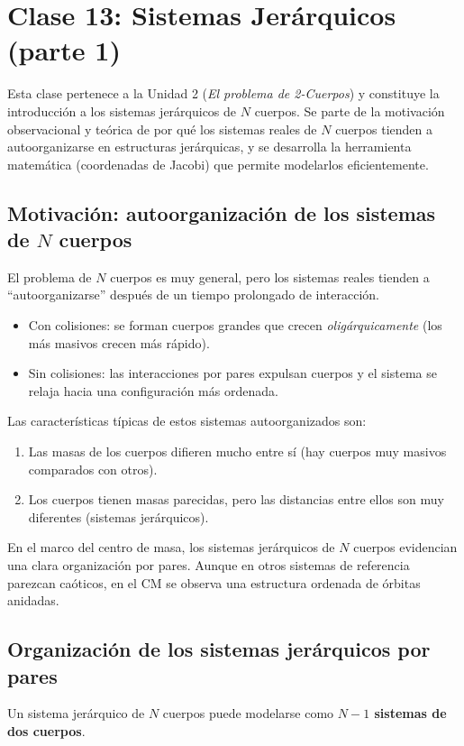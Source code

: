 \chapter{Clase 13: Sistemas Jerárquicos (parte 1)}

Esta clase pertenece a la Unidad 2 (\emph{El problema de 2-Cuerpos}) y constituye la introducción a los sistemas jerárquicos de \(N\) cuerpos. Se parte de la motivación observacional y teórica de por qué los sistemas reales de \(N\) cuerpos tienden a autoorganizarse en estructuras jerárquicas, y se desarrolla la herramienta matemática (coordenadas de Jacobi) que permite modelarlos eficientemente.

\section{Motivación: autoorganización de los sistemas de \texorpdfstring{$N$}{N} cuerpos}
El problema de \(N\) cuerpos es muy general, pero los sistemas reales tienden a ``autoorganizarse'' después de un tiempo prolongado de interacción.

\begin{itemize}
    \item Con colisiones: se forman cuerpos grandes que crecen \emph{oligárquicamente} (los más masivos crecen más rápido).
    \item Sin colisiones: las interacciones por pares expulsan cuerpos y el sistema se relaja hacia una configuración más ordenada.
\end{itemize}

Las características típicas de estos sistemas autoorganizados son:
\begin{enumerate}
    \item Las masas de los cuerpos difieren mucho entre sí (hay cuerpos muy masivos comparados con otros).
    \item Los cuerpos tienen masas parecidas, pero las distancias entre ellos son muy diferentes (sistemas jerárquicos).
\end{enumerate}

\begin{importante}
En el marco del centro de masa, los sistemas jerárquicos de \(N\) cuerpos evidencian una clara organización por pares. Aunque en otros sistemas de referencia parezcan caóticos, en el CM se observa una estructura ordenada de órbitas anidadas.
\end{importante}

\section{Organización de los sistemas jerárquicos por pares}
Un sistema jerárquico de \(N\) cuerpos puede modelarse como \textbf{\(N-1\) sistemas de dos cuerpos}.

